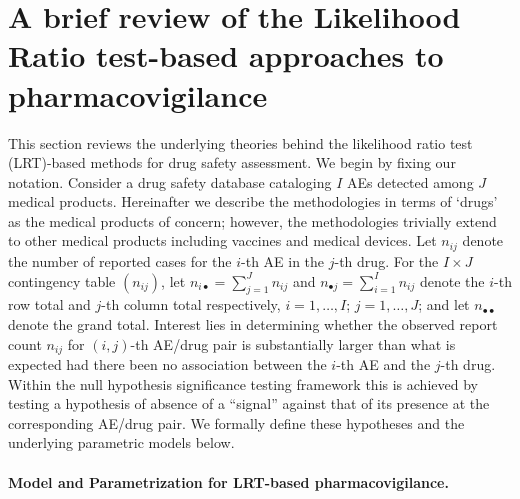 \hypertarget{a-brief-review-of-the-likelihood-ratio-test-based-approaches-to-pharmacovigilance}{%
\section{A brief review of the Likelihood Ratio test-based approaches to pharmacovigilance}\label{a-brief-review-of-the-likelihood-ratio-test-based-approaches-to-pharmacovigilance}}

This section reviews the underlying theories behind the likelihood ratio test (LRT)-based methods for drug safety assessment. We begin by fixing our notation. Consider a drug safety database cataloging \(I\) AEs detected among \(J\) medical products. Hereinafter we describe the methodologies in terms of `drugs' as the medical products of concern; however, the methodologies trivially extend to other medical products including vaccines and medical devices. Let \(n_{ij}\) denote the number of reported cases for the \(i\)-th AE in the \(j\)-th drug. For the \(I \times J\) contingency table \((n_{ij})\), let \(n_{i\bullet} = \sum_{j=1}^{J} n_{ij}\) and \(n_{\bullet j} = \sum_{i=1}^{I} n_{ij}\) denote the \(i\)-th row total and \(j\)-th column total respectively, \(i = 1, \dots, I\); \(j = 1, \dots, J\); and let \(n_{\bullet \bullet}\) denote the grand total. Interest lies in determining whether the observed report count \(n_{ij}\) for \((i, j)\)-th AE/drug pair is substantially larger than what is expected had there been no association between the \(i\)-th AE and the \(j\)-th drug. Within the null hypothesis significance testing framework this is achieved by testing a hypothesis of absence of a ``signal'' against that of its presence at the corresponding AE/drug pair. We formally define these hypotheses and the underlying parametric models below.

\hypertarget{model-and-parametrization-for-lrt-based-pharmacovigilance.}{%
\paragraph{Model and Parametrization for LRT-based pharmacovigilance.}\label{model-and-parametrization-for-lrt-based-pharmacovigilance.}}

